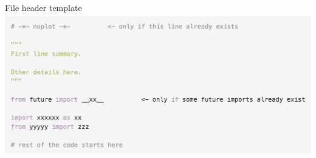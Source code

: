 \documentclass{beamer}
\begin{document}
\begin{frame}{File header template}
\includegraphics[width=\textwidth]{img/template}\\
\end{frame}




\ThankYouFrame
\end{document}
